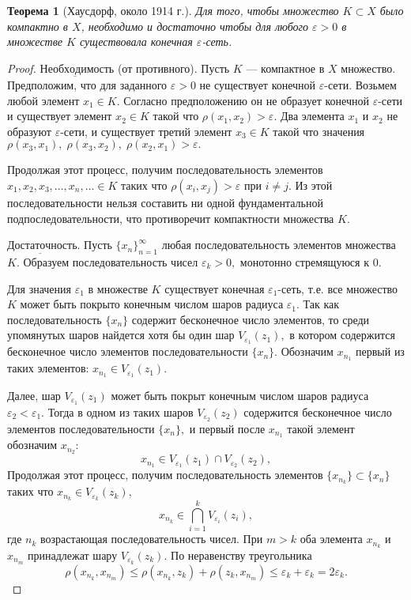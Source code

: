 \documentclass[12pt,a4paper,titlepage,oneside]{book}
\theoremstyle{definition}
\theoremstyle{plain}
\newtheorem*{theorem}{Теорема}
\theoremstyle{break}
\theoremstyle{remark}
\theoremstyle{remark}
\theoremstyle{remark}
\theoremstyle{remark}
\theoremstyle{plain}
\theoremstyle{plain}
\begin{document}
\begin{theorem}[Хаусдорф, около 1914 г.]
Для того, чтобы множество $K \subset X$ было компактно в $X$, необходимо и достаточно чтобы для любого $\varepsilon > 0$ в множестве $K$ существовала конечная $\varepsilon$-сеть. 
\end{theorem}
\begin{proof}

$\underbar{Необходимость}$ (от противного). Пусть $K$  --- компактное в $X$ множество. Предположим, что для заданного $\varepsilon >0 $ не существует конечной $\varepsilon$-сети. Возьмем любой элемент $x_1 \in K.$ Согласно предположению он не образует конечной $\varepsilon$-сети и существует элемент $x_2 \in K$ такой что $\rho(x_1, x_2) > \varepsilon.$ Два элемента $x_1$ и $x_2$ не образуют $\varepsilon$-сети, и существует третий элемент $x_3 \in K$ такой что значения $\rho(x_3, x_1), \; \rho(x_3, x_2), \; \rho(x_2, x_1) > \varepsilon.$

Продолжая этот процесс, получим последовательность элементов $x_1,x_2,x_3, \ldots, x_n, \ldots \in K$ таких что $\rho(x_i, x_j) > \varepsilon$ при   $i \neq j$. Из этой последовательности нельзя составить ни одной фундаментальной подпоследовательности, что противоречит компактности множества $K.$

$\underbar{Достаточность}$. Пусть $\{x_n\}_{n=1}^{\infty}$ любая последовательность элементов множества $K.$ Образуем последовательность чисел $\varepsilon _k > 0,$ монотонно стремящуюся к $0.$

Для значения $\varepsilon _1$  в множестве $K$ существует конечная $\varepsilon _1$-сеть, т.е. все множество $K$ может быть покрыто конечным числом шаров радиуса $\varepsilon _1 .$ Так как последовательность $\{ x_n \}$ содержит бесконечное число элементов, то среди упомянутых шаров найдется хотя бы один шар $V_{\varepsilon _1} (z_1),$ в котором содержится бесконечное число элементов последовательности $\{x_n\}.$ Обозначим $x_{n_1}$ первый из таких элементов: $x_{n_1} \in V_{\varepsilon _1} (z_1).$

Далее, шар $ V_{\varepsilon _1} (z_1) $ может быть покрыт конечным числом шаров радиуса $\varepsilon _2 < \varepsilon _1.$ Тогда в одном из таких шаров $V_{\varepsilon _2} (z_2)$ содержится бесконечное число элементов последовательности $\{x_n\},$ и первый после $x_{n_1}$ такой элемент обозначим $x_{n_2}:$
\begin{equation*}
x_{n_1} \in V_{\varepsilon _1} (z_1) \cap V_{\varepsilon _2} (z_2),
\end{equation*}
Продолжая этот процесс, получим последовательность элементов $\{x_{n_k}\} \subset \{x_n\}$ таких что $x_{n_k} \in V_{\varepsilon _k} (z_k),$
\begin{equation*}
x_{n_k} \in \bigcap\limits_{i=1}^{k} V_{\varepsilon _i} (z_i),
\end{equation*}
где $n_k$  возрастающая последовательность чисел. При $m > k$ оба элемента $x_{n_k}$ и $x_{n_m}$ принадлежат шару $V_{\varepsilon _k} (z_k).$ По неравенству треугольника 
\begin{equation*}
\rho(x_{n_k}, x_{n_m}) \leqslant \rho(x_{n_k}, z_k) + \rho(z_k, x_{n_m}) \leqslant \varepsilon_k + \varepsilon_k = 2 \varepsilon _k.
\end{equation*}
 

\end{proof}
\end{document}
